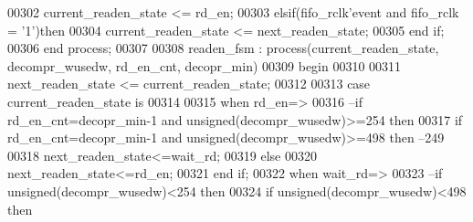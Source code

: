 \begin{DoxyCode}
00302         \textcolor{vhdlchar}{current_readen_state} \textcolor{vhdlchar}{<=} \textcolor{vhdlchar}{rd\_en};
00303     \textcolor{keywordflow}{elsif}\textcolor{vhdlchar}{(}\textcolor{vhdlchar}{fifo_rclk}\textcolor{vhdlchar}{'}\textcolor{vhdlkeyword}{event} \textcolor{keywordflow}{and} \textcolor{vhdlchar}{fifo_rclk} \textcolor{vhdlchar}{=} \textcolor{vhdlchar}{'}\textcolor{vhdllogic}{}\textcolor{vhdllogic}{1}\textcolor{vhdlchar}{'}\textcolor{vhdlchar}{)}\textcolor{keywordflow}{then} 
00304         \textcolor{vhdlchar}{current_readen_state} \textcolor{vhdlchar}{<=} \textcolor{vhdlchar}{next_readen_state};
00305     \textcolor{keywordflow}{end} \textcolor{keywordflow}{if}; 
00306 \textcolor{keywordflow}{end} \textcolor{keywordflow}{process};
00307 
00308 readen\_fsm : \textcolor{keywordflow}{process}(current_readen_state, decompr_wusedw, rd_en_cnt, decopr_min)
00309 \textcolor{vhdlkeyword}{begin}
00310   
00311     \textcolor{vhdlchar}{next_readen_state} \textcolor{vhdlchar}{<=} \textcolor{vhdlchar}{current_readen_state};
00312     
00313     \textcolor{keywordflow}{case} \textcolor{vhdlchar}{current_readen_state} \textcolor{keywordflow}{is}
00314 
00315       \textcolor{keywordflow}{when} \textcolor{vhdlchar}{rd\_en}\textcolor{vhdlchar}{=}\textcolor{vhdlchar}{>}
00316 \textcolor{keyword}{        --if rd\_en\_cnt=decopr\_min-1 and unsigned(decompr\_wusedw)>=254 then}
00317         \textcolor{keywordflow}{if} \textcolor{vhdlchar}{rd_en_cnt}\textcolor{vhdlchar}{=}\textcolor{vhdlchar}{decopr_min}\textcolor{vhdlchar}{-}\textcolor{vhdllogic}{}\textcolor{vhdllogic}{1} \textcolor{keywordflow}{and} \textcolor{comment}{unsigned}\textcolor{vhdlchar}{(}\textcolor{vhdlchar}{decompr_wusedw}\textcolor{vhdlchar}{)}\textcolor{vhdlchar}{>=}\textcolor{vhdllogic}{}\textcolor{vhdllogic}{498} \textcolor{keywordflow}{then}\textcolor{keyword}{ --249 }
00318             \textcolor{vhdlchar}{next_readen_state}\textcolor{vhdlchar}{<=}\textcolor{vhdlchar}{wait\_rd};
00319         \textcolor{keywordflow}{else}
00320             \textcolor{vhdlchar}{next_readen_state}\textcolor{vhdlchar}{<=}\textcolor{vhdlchar}{rd\_en}; 
00321         \textcolor{keywordflow}{end} \textcolor{keywordflow}{if};
00322       \textcolor{keywordflow}{when} \textcolor{vhdlchar}{wait\_rd}\textcolor{vhdlchar}{=}\textcolor{vhdlchar}{>}
00323 \textcolor{keyword}{                --if  unsigned(decompr\_wusedw)<254 then}
00324                 \textcolor{keywordflow}{if}  \textcolor{comment}{unsigned}\textcolor{vhdlchar}{(}\textcolor{vhdlchar}{decompr_wusedw}\textcolor{vhdlchar}{)}\textcolor{vhdlchar}{<}\textcolor{vhdllogic}{}\textcolor{vhdllogic}{498} \textcolor{keywordflow}{then}  

\end{DoxyCode}
